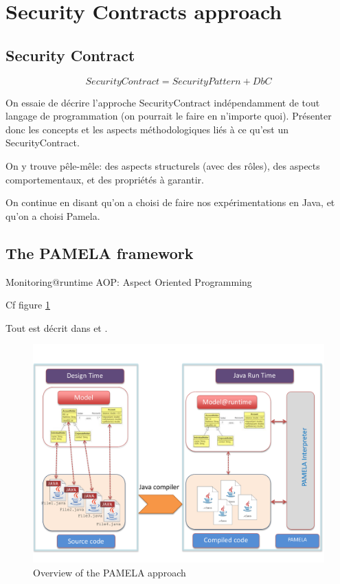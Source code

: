 \section{Security Contracts approach}
\label{sec:security-contracts-approach}

\subsection{Security Contract}

\begin{equation}
SecurityContract = SecurityPattern + DbC
\end{equation}

On essaie de décrire l'approche SecurityContract indépendamment de tout langage de programmation (on pourrait le faire en n'importe quoi). Présenter donc les concepts et les aspects méthodologiques liés à ce qu'est un SecurityContract.

On y trouve pêle-mêle: des aspects structurels (avec des rôles), des aspects comportementaux, et des propriétés à garantir.

On continue en disant qu'on a choisi de faire nos expérimentations en Java, et qu'on a choisi Pamela. 

\subsection{The PAMELA framework}

Monitoring@runtime
AOP: Aspect Oriented Programming

Cf figure \ref{fig:PamelaVision}

Tout est décrit dans \cite{guerin:hal-03217126} et \cite{silva:hal-02958111}.

\begin{figure}
    \centering
    \includegraphics[width=1.0 \columnwidth]{figures/PamelaVisionV2.pdf}
    \caption{Overview of the PAMELA approach}
    \label{fig:PamelaVision}
\end{figure}


